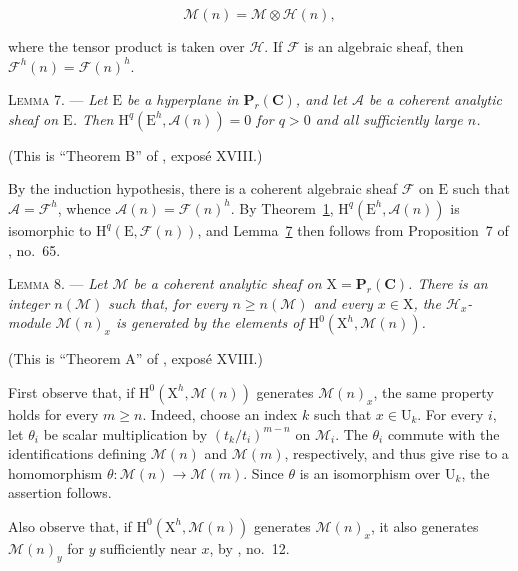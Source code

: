 \begin{equation*}
\mathcal{M}(n)=\mathcal{M}\otimes\mathcal{H}(n),
\end{equation*}

where the tensor product is taken over $\mathcal{H}$. If $\mathcal{F}$ is an algebraic sheaf, then $\mathcal{F}^h(n)=\mathcal{F}(n)^h$.

\textsc{Lemma 7}. --- \emph{Let $\mathrm{E}$ be a hyperplane in $\mathbf{P}_r(\mathbf{C})$, and let $\mathcal{A}$ be a coherent analytic sheaf on $\mathrm{E}$. Then $\mathrm{H}^q(\mathrm{E}^h,\mathcal{A}(n))=0$ for $q>0$ and all sufficiently large $n$.}

(This is ``Theorem B'' of , exposé XVIII.)

By the induction hypothesis, there is a coherent algebraic sheaf $\mathcal{F}$ on $\mathrm{E}$ such that $\mathcal{A}=\mathcal{F}^h$, whence $\mathcal{A}(n)=\mathcal{F}(n)^h$. By Theorem~\hyperref[gaga:thm:1]{1}, $\mathrm{H}^q(\mathrm{E}^h,\mathcal{A}(n))$ is isomorphic to $\mathrm{H}^q(\mathrm{E},\mathcal{F}(n))$, and Lemma~\hyperref[gaga:lemma:7]{7} then follows from Proposition~7 of , no.~65.

\textsc{Lemma 8}. --- \emph{Let $\mathcal{M}$ be a coherent analytic sheaf on $\mathrm{X}=\mathbf{P}_r(\mathbf{C})$. There is an integer $n(\mathcal{M})$ such that, for every $n\geqslant n(\mathcal{M})$ and every $x\in \mathrm{X}$, the $\mathcal{H}_x$-module $\mathcal{M}(n)_x$ is generated by the elements of $\mathrm{H}^0(\mathrm{X}^h,\mathcal{M}(n))$.}

(This is ``Theorem A'' of , exposé XVIII.)

First observe that, if $\mathrm{H}^0(\mathrm{X}^h,\mathcal{M}(n))$ generates $\mathcal{M}(n)_x$, the same property holds for every $m\geqslant n$. Indeed, choose an index $k$ such that $x\in \mathrm{U}_k$. For every $i$, let $\theta_i$ be scalar multiplication by $(t_k/t_i)^{m-n}$ on $\mathcal{M}_i$. The $\theta_i$ commute with the identifications defining $\mathcal{M}(n)$ and $\mathcal{M}(m)$, respectively, and thus give rise to a homomorphism $\theta:\mathcal{M}(n)\to\mathcal{M}(m)$. Since $\theta$ is an isomorphism over $\mathrm{U}_k$, the assertion follows.

Also observe that, if $\mathrm{H}^0(\mathrm{X}^h,\mathcal{M}(n))$ generates $\mathcal{M}(n)_x$, it also generates $\mathcal{M}(n)_y$ for $y$ sufficiently near $x$, by , no.~12.

